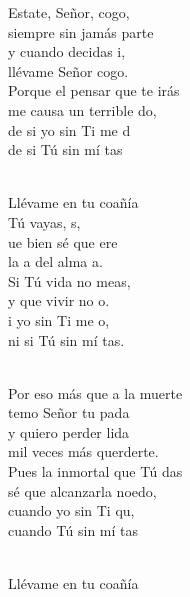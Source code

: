 \begin{cancion}%
	Estate, Señor, cogo, \\
	siempre sin jamás parte\\
	y cuando decidas i,\\
	llévame Señor cogo.\\
Porque el pensar que te irás \\
	me causa un terrible do,\\
	de si yo sin Ti me d\\
	de si Tú sin mí tas\\\jump\\
	\begin{chorus}%
	Llévame en tu coañía \\
	 Tú vayas, s, \\
	ue bien sé que ere \\
	la a del alma a.\\
	Si Tú vida no meas,\\
	y que vivir no o.\\
	i yo sin Ti me o, \\
	ni si Tú sin mí tas.\\
	\end{chorus}%
	\jump\\
Por eso más que a la muerte\\
	temo Señor tu pada\\
	y quiero perder lida\\
	mil veces más querderte.\\
Pues la inmortal que Tú das\\
	sé que alcanzarla noedo,\\
	cuando yo sin Ti qu,\\
	cuando Tú sin mí tas\\\jump\\
	\begin{chorus}%
	Llévame en tu coañía \\

\end{chorus}
\end{cancion}
